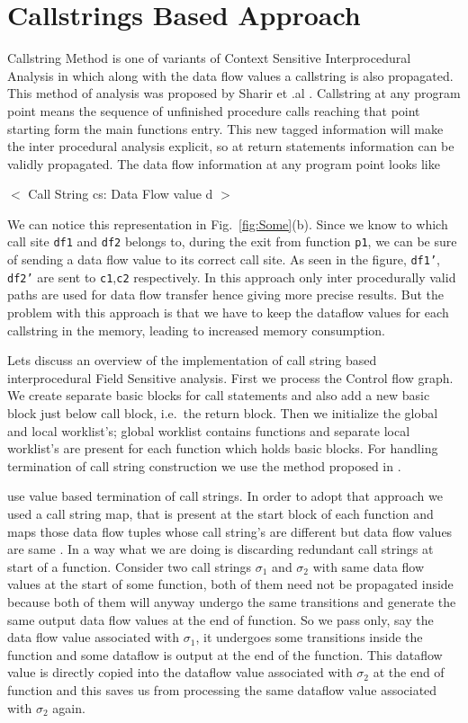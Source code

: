 \section{Callstrings Based Approach}
Callstring Method is one of variants of Context Sensitive Interprocedural Analysis in which along with the data flow values a 
callstring is also propagated. This method of analysis was proposed by Sharir et .al \cite{TwoApproach}. Callstring at 
any program point means the sequence of unfinished procedure calls reaching that point starting form the main functions entry. This 
new tagged information will make the inter procedural analysis explicit, so at return statements information can be validly propagated.
The data flow information at any program point looks like 
  \begin{center}
$<$ Call String cs: Data Flow value d $>$ \\   
  \end{center}
We can notice this representation in Fig.~\ref{fig:Some}(b). Since we know to which call site {\tt df1} and {\tt df2} belongs to, during the 
exit from function {\tt p1}, we can be sure of sending a data flow value to its correct call site. As seen in the figure, {\tt df1'}, {\tt df2'} are 
sent to {\tt c1},{\tt c2} respectively. In this approach only inter procedurally valid paths are used for data flow transfer hence giving more 
precise results. But the problem with this approach is that we have to keep the dataflow values for each callstring
in the memory, leading to increased memory consumption.

Lets discuss an overview of the implementation of call string based interprocedural Field Sensitive analysis. First we process the Control flow
graph. We create separate basic blocks for call statements and also add a new basic block just below call block, i.e.\ the return block.
Then we initialize the global and local worklist's; global worklist contains functions and separate local worklist's are present for each function
which holds basic blocks. For handling termination of call string construction we use the method proposed in \cite{LazyPointer}.

\cite{LazyPointer} use value based termination of call strings. In order to adopt that approach we used a call string map, that 
is present at the start block of each function and maps those data flow tuples whose call string's are different but data flow values are same .
In a way what we are doing is discarding redundant call strings at start of a function.
Consider two call strings ${\sigma}_1$ and ${\sigma}_2$ with same data flow values at the start of some function, both of them need not be 
propagated inside because both of them will anyway undergo the same transitions and generate the same output data flow values at the end of 
function. So we pass only, say the data flow value associated with ${\sigma}_1$, it undergoes some transitions inside the function and some 
dataflow is output at the 
end of the function. This dataflow value is directly copied into the dataflow value associated with ${\sigma}_2$ at the end of function and this 
saves us from processing the same dataflow value associated with ${\sigma}_2$ again.


